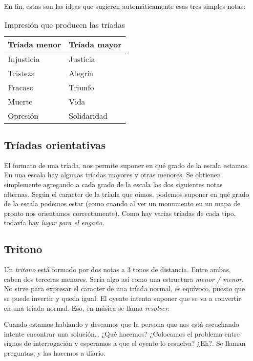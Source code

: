 \documentclass[]{report}
\begin{document}
En fin, estas son las ideas que sugieren automáticamente esas tres simples notas:

\begin{table}[htbp]
  \centering
  \begin{tabular}{ll}
    \toprule
    \textbf{Tríada menor} & \textbf{Tríada mayor} \\
    \midrule
    Injusticia  & Justicia \\
    Tristeza    & Alegría \\
    Fracaso & Triunfo \\
    Muerte  & Vida \\
    Opresión    & Solidaridad \\
    \bottomrule
  \end{tabular}
  \caption{Impresión que producen las tríadas}\label{tab:triad-impressions}
\end{table}

\subsection{Tríadas orientativas}

El formato de una tríada, nos permite suponer en qué grado de la escala estamos. En una escala hay algunas tríadas mayores y otras menores. Se obtienen simplemente agregando a cada grado de la escala las dos siguientes notas alternas. Según el caracter de la tríada que oímos, podemos suponer en qué grado de la escala podemos estar (como cuando al ver un monumento en un mapa de pronto nos orientamos correctamente). Como hay varias tríadas de cada tipo, todavía hay \emph{lugar para el engaño}.

\subsection{Tritono}

Un \emph{tritono} está formado por dos notas a 3 tonos de distancia. Entre ambas, caben dos terceras menores. Sería algo así como una estructura \emph{menor / menor}. No sirve para expresar el caracter de una tríada normal, es equívoco, puesto que se puede invertir y queda igual. El oyente intenta suponer que se va a convertir en una tríada normal. Eso, en música se llama \emph{resolver}.

Cuando estamos hablando y deseamos que la persona que nos está escuchando intente encontrar una solución\ldots{} ¿Qué hacemos? ¿Colocamos el problema entre signos de interrogación y esperamos a que el oyente lo resuelva? ¿Eh?. Se llaman preguntas, y las hacemos a diario.
\end{document}
